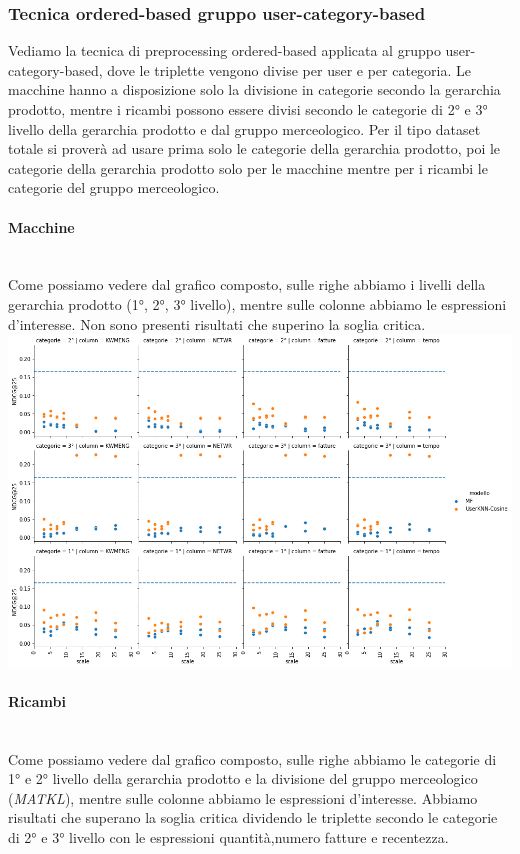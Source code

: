 \subsubsection{Tecnica ordered-based gruppo user-category-based}
Vediamo la tecnica di preprocessing ordered-based applicata al gruppo user-category-based, dove le triplette vengono divise per user e per categoria.
Le macchine hanno a disposizione solo la divisione in categorie secondo la gerarchia prodotto, mentre i ricambi possono essere divisi secondo le categorie di 2° e 3° livello della gerarchia prodotto e dal gruppo merceologico. Per il tipo dataset totale si proverà ad usare prima solo le categorie della gerarchia prodotto, poi le categorie della gerarchia prodotto solo per le macchine mentre per i ricambi le categorie del gruppo merceologico.

\paragraph{Macchine}\mbox{} \\
Come possiamo vedere dal grafico composto, sulle righe abbiamo i livelli della gerarchia prodotto (1°, 2°, 3° livello), mentre sulle colonne abbiamo le espressioni d'interesse. 
Non sono presenti risultati che superino la soglia critica.\\

\includegraphics[width=16cm]{figures/risultati_ordered_categoria_macchine.png}
\newpage

\paragraph{Ricambi}\mbox{} \\
Come possiamo vedere dal grafico composto, sulle righe abbiamo le categorie di 1° e 2° livello della gerarchia prodotto e la divisione del gruppo merceologico (\textit{MATKL}), mentre sulle colonne abbiamo le espressioni d'interesse. Abbiamo risultati che superano la soglia critica dividendo le triplette secondo le categorie di 2° e 3° livello con le espressioni quantità,numero fatture e recentezza.\\

